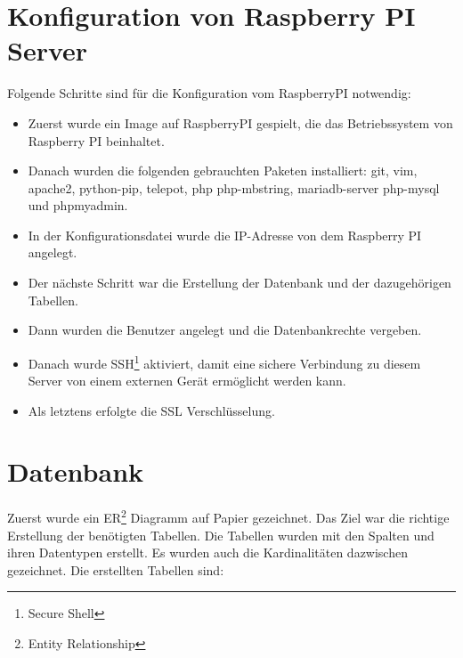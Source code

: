 \section{Konfiguration von Raspberry PI Server}
Folgende Schritte sind für die Konfiguration vom RaspberryPI notwendig: \\
\begin{itemize}
	\item Zuerst wurde ein Image auf RaspberryPI gespielt, die das Betriebssystem von Raspberry PI beinhaltet.
\end{itemize}
\begin{itemize}
	\item Danach wurden die folgenden gebrauchten Paketen installiert: git, vim, apache2, python-pip, telepot, php php-mbstring, mariadb-server php-mysql und phpmyadmin.
\end{itemize}
\begin{itemize}
	\item In der Konfigurationsdatei wurde die IP-Adresse von dem Raspberry PI angelegt.
\end{itemize}
\begin{itemize}
	\item Der nächste Schritt war die Erstellung der Datenbank und der dazugehörigen Tabellen.
\end{itemize}
\begin{itemize}
	\item Dann wurden die Benutzer angelegt und die Datenbankrechte vergeben.
\end{itemize}
\begin{itemize}
	\item Danach wurde SSH\footnote{Secure Shell} aktiviert, damit eine sichere Verbindung zu diesem Server von einem externen Gerät ermöglicht werden kann.
\end{itemize}
\begin{itemize}
	\item Als letztens erfolgte die SSL Verschl\"usselung.
\end{itemize}
\section{Datenbank}
Zuerst wurde ein ER\footnote{Entity Relationship} Diagramm auf Papier gezeichnet. Das Ziel war die richtige Erstellung der benötigten Tabellen. Die Tabellen wurden mit den Spalten und ihren Datentypen erstellt. Es wurden auch die Kardinalitäten dazwischen gezeichnet. Die erstellten Tabellen sind:
	
